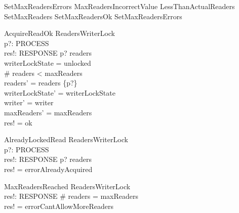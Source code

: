 \documentclass{article}
\begin{document}


\begin{zed}
SetMaxReadersErrors  MaxReadersIncorrectValue \lor LessThanActualReaders 
\also
SetMaxReaders  SetMaxReadersOk \lor SetMaxReadersErrors
\end{zed}

\begin{schema}{AcquireReadOk}
    \Delta ReadersWriterLock \\
    p?: PROCESS \\
    res!: RESPONSE
\where
    p? \notin readers \\
    writerLockState = unlocked \\
    \# readers < maxReaders \\
    readers' = readers \cup \{p?\} \\
    writerLockState' = writerLockState \\
    writer' = writer \\
    maxReaders' = maxReaders \\
    res! = ok
\end{schema}

\begin{schema}{AlreadyLockedRead}
    \Xi ReadersWriterLock \\
    p?: PROCESS \\
    res!: RESPONSE
\where
    p? \in readers \\
    res! = errorAlreadyAcquired
\end{schema}

\begin{schema}{MaxReadersReached}
    \Xi ReadersWriterLock \\
    res!: RESPONSE
\where
    \# readers = maxReaders \\
    res! = errorCantAllowMoreReaders
\end{schema}
\end{document}
